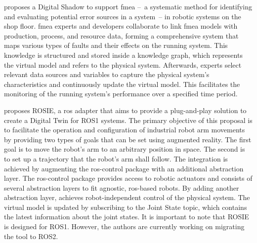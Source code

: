 \Textcite{DSforLowDelayAnalysisOfProdQualityRisk} proposes a Digital Shadow to support \acf{fmea} --~a systematic method for identifying and evaluating potential error sources in a system~-- in robotic systems on the shop floor. \ac{fmea} experts and developers collaborate to link \ac{fmea} models with production, process, and resource data, forming a comprehensive system that maps various types of faults and their effects on the running system. This knowledge is structured and stored inside a knowledge graph, which represents the virtual model and refers to the physical system. Afterwards, experts select relevant data sources and variables to capture the physical system's characteristics and continuously update the virtual model. This facilitates the monitoring of the running system's performance over a specified time period.

\Textcite{ROSIE} proposes ROSIE, a \acs{ros} adapter that aims to provide a plug-and-play solution to create a Digital Twin for ROS1 systems. The primary objective of this proposal is to facilitate the operation and configuration of industrial robot arm movements by providing two types of goals that can be set using augmented reality. The first goal is to move the robot's arm to an arbitrary position in space. The second is to set up a trajectory that the robot's arm shall follow. The integration is achieved by augmenting the \acs{ros}-control package with an additional abstraction layer. The \acs{ros}-control package provides access to robotic actuators and consists of several abstraction layers to fit agnostic, \acs{ros}-based robots. By adding another abstraction layer, \Textcite{ROSIE} achieves robot-independent control of the physical system. The virtual model is updated by subscribing to the \glqq{}Joint State\grqq{} topic, which contains the latest information about the joint states. It is important to note that ROSIE is designed for ROS1. However, the authors are currently working on migrating the tool to ROS2.

